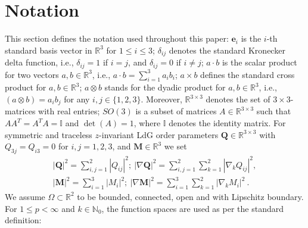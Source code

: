 \documentclass{article}
\def\Qvec{\mathbf{Q}}
\def \Mvec{\mathbf{M}}
\begin{document}
\section{Notation}\label{not} This section defines the notation used throughout this paper: $\textbf{e}_i$ is the $i$-th standard basis vector in $\mathbb R^3$ for $1\le i\le 3$; $\delta_{ij}$ denotes the standard Kronecker delta function, i.e., $\delta_{ij}=1$ if $i=j$, and $\delta_{ij}=0$ if $i\ne j$; $a\cdot b$ is the scalar product for two vectors $a, b\in\mathbb{R}^3$, i.e., $a\cdot b=\sum_{i=1}^{3}a_ib_i$; $a\times b$ defines the standard cross product for $a, b\in\mathbb{R}^3$; $a\otimes b$ stands for the dyadic product for $a, b\in\mathbb{R}^3$, i.e., $\left(a\otimes b\right)=a_ib_j$ for any $i,j\in\{1,2,3\}$. Moreover, $\mathbb{R}^{3\times 3}$ denotes the set of $3\times 3$-matrices with real entries; $SO\left(3\right)$ is a subset of matrices $A \in \mathbb R^{3\times 3}$ such that $AA^T=A^TA=\mathbb{I}$ and $\det(A)=1$, where $\mathbb{I}$ denotes the identity matrix. For symmetric and traceless $z$-invariant LdG order parameters $\Qvec\in\mathbb{R}^{3\times 3}$ with $Q_{3j}=Q_{i3}=0$ for $i,j =1,2,3$, and $\Mvec\in \mathbb{R}^3$ we set
\begin{eqnarray}
|\Qvec|^2=\sum_{i,j=1}^{2}|Q_{ij}|^2;~|\nabla\Qvec|^2=\sum_{i,j=1}^2 \sum_{k=1}^2|\nabla_k Q_{ij}|^2,\nonumber\\
|\Mvec|^2=\sum_{i=1}^{3}|M_i|^2;~|\nabla\Mvec|^2=\sum_{i=1}^{3}\sum_{k=1}^{2}|\nabla_k M_i|^2~.\nonumber
\end{eqnarray}
We assume $\Omega\subset\mathbb {R}^2$ to be bounded, connected, open and with Lipschitz boundary. 
For $1\leq p< \infty$ and $k\in \mathbb{N}_0$, the function spaces are used as per the standard definition:
\end{document}
